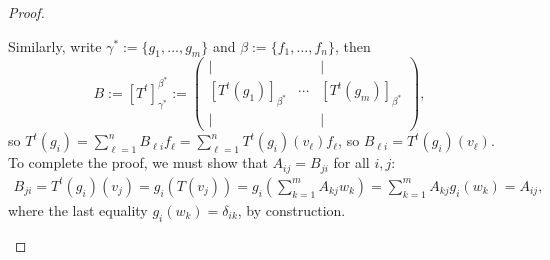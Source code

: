 \begin{proof}
\begin{enumerate}
        Similarly, write $\gamma^\ast := \{g_1, \dots, g_m\}$ and $\beta:= \{f_1, \dots, f_n\}$, then $$B := [T^t]_{\gamma^\ast}^{\beta^\ast} := \begin{pmatrix}
            \vert & & \vert\\
            [T^t(g_1)]_{\beta^\ast} & \cdots & [T^t(g_m)]_{\beta^\ast}\\ 
            \vert & & \vert
        \end{pmatrix},$$
        so $T^t(g_i) = \sum_{\ell=1}^{n} B_{\ell i} f_\ell= \sum_{\ell=1}^n T^t(g_i)(v_\ell)f_\ell$, so $B_{\ell i} = T^t(g_i)(v_\ell)$. To complete the proof, we must show that $A_{ij} = B_{ji}$ for all $i,j$:
        \begin{align*}
            B_{ji} = T^t(g_i)(v_j) = g_i(T(v_j)) = g_i(\sum_{k=1}^m A_{kj} w_k) = \sum_{k=1}^m A_{kj} g_i(w_k) = A_{ij},
        \end{align*}
        where the last equality $g_i(w_k) = \delta_{ik}$, by construction.
    \end{enumerate}
\end{proof}


